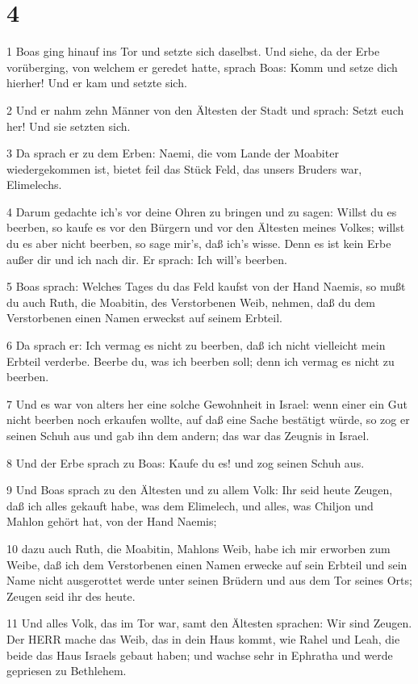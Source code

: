 \chapter{4}

\par 1 Boas ging hinauf ins Tor und setzte sich daselbst. Und siehe, da der Erbe vorüberging, von welchem er geredet hatte, sprach Boas: Komm und setze dich hierher! Und er kam und setzte sich.
\par 2 Und er nahm zehn Männer von den Ältesten der Stadt und sprach: Setzt euch her! Und sie setzten sich.
\par 3 Da sprach er zu dem Erben: Naemi, die vom Lande der Moabiter wiedergekommen ist, bietet feil das Stück Feld, das unsers Bruders war, Elimelechs.
\par 4 Darum gedachte ich's vor deine Ohren zu bringen und zu sagen: Willst du es beerben, so kaufe es vor den Bürgern und vor den Ältesten meines Volkes; willst du es aber nicht beerben, so sage mir's, daß ich's wisse. Denn es ist kein Erbe außer dir und ich nach dir. Er sprach: Ich will's beerben.
\par 5 Boas sprach: Welches Tages du das Feld kaufst von der Hand Naemis, so mußt du auch Ruth, die Moabitin, des Verstorbenen Weib, nehmen, daß du dem Verstorbenen einen Namen erweckst auf seinem Erbteil.
\par 6 Da sprach er: Ich vermag es nicht zu beerben, daß ich nicht vielleicht mein Erbteil verderbe. Beerbe du, was ich beerben soll; denn ich vermag es nicht zu beerben.
\par 7 Und es war von alters her eine solche Gewohnheit in Israel: wenn einer ein Gut nicht beerben noch erkaufen wollte, auf daß eine Sache bestätigt würde, so zog er seinen Schuh aus und gab ihn dem andern; das war das Zeugnis in Israel.
\par 8 Und der Erbe sprach zu Boas: Kaufe du es! und zog seinen Schuh aus.
\par 9 Und Boas sprach zu den Ältesten und zu allem Volk: Ihr seid heute Zeugen, daß ich alles gekauft habe, was dem Elimelech, und alles, was Chiljon und Mahlon gehört hat, von der Hand Naemis;
\par 10 dazu auch Ruth, die Moabitin, Mahlons Weib, habe ich mir erworben zum Weibe, daß ich dem Verstorbenen einen Namen erwecke auf sein Erbteil und sein Name nicht ausgerottet werde unter seinen Brüdern und aus dem Tor seines Orts; Zeugen seid ihr des heute.
\par 11 Und alles Volk, das im Tor war, samt den Ältesten sprachen: Wir sind Zeugen. Der HERR mache das Weib, das in dein Haus kommt, wie Rahel und Leah, die beide das Haus Israels gebaut haben; und wachse sehr in Ephratha und werde gepriesen zu Bethlehem.
